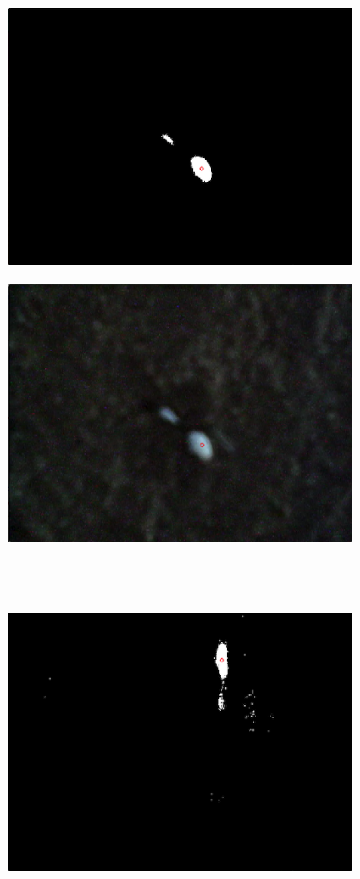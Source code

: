 \begin{figure}
        \centering
        \begin{subfigure}[b]{0.35\textwidth}
                \includegraphics[scale = 0.3]{img/good1t}
                \caption{}
        \end{subfigure}
		\quad
        \begin{subfigure}[b]{0.35\textwidth}
                \includegraphics[scale = 0.3]{img/good1}
                \caption{}
        \end{subfigure} \hfill \\ \mbox{}\\
        \begin{subfigure}[b]{0.35\textwidth}
                \includegraphics[scale = 0.3]{img/good2t}

\end{subfigure}
\end{figure}
